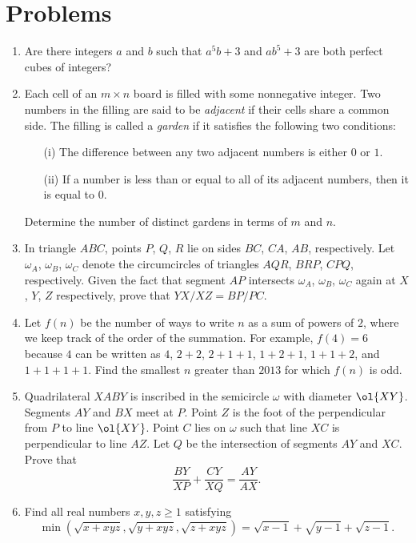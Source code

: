 \documentclass[11pt]{scrartcl}
\begin{document}
\section{Problems}
\begin{enumerate}[\bfseries 1.]
\item %
Are there integers $a$ and $b$
such that $a^5b+3$ and $ab^5+3$
are both perfect cubes of integers?

\item %
Each cell of an $m\times n$ board is filled with some nonnegative integer.
Two numbers in the filling are said to be
\emph{adjacent} if their cells share a common side.
The filling is called a \emph{garden} if it
satisfies the following two conditions:
\begin{enumerate}
  \item[(i)] The difference between
    any two adjacent numbers is either $0$ or $1$.
  \item[(ii)] If a number is less than or equal to
    all of its adjacent numbers, then it is equal to $0$.
\end{enumerate}
Determine the number of distinct gardens in terms of $m$ and $n$.

\item %
In triangle $ABC$,
points $P$, $Q$, $R$ lie on sides $BC$, $CA$, $AB$, respectively.
Let $\omega_A$, $\omega_B$, $\omega_C$ denote the
circumcircles of triangles $AQR$, $BRP$, $CPQ$, respectively.
Given the fact that segment $AP$ intersects
$\omega_A$, $\omega_B$, $\omega_C$ again at $X$, $Y$, $Z$ respectively,
prove that $YX/XZ=BP/PC$.

\item %
Let $f(n)$ be the number of ways to write $n$ as a sum of powers of $2$,
where we keep track of the order of the summation.
For example, $f(4)=6$ because $4$ can be written
as $4$, $2+2$, $2+1+1$, $1+2+1$, $1+1+2$, and $1+1+1+1$.
Find the smallest $n$ greater than $2013$ for which $f(n)$ is odd.

\item %
Quadrilateral $XABY$ is inscribed in the semicircle $\omega$ with
diameter $\ol{XY}$.
Segments $AY$ and $BX$ meet at $P$.
Point $Z$ is the foot of the perpendicular from $P$ to line $\ol{XY}$.
Point $C$ lies on $\omega$ such that line $XC$ is perpendicular to line $AZ$.
Let $Q$ be the intersection of segments $AY$ and $XC$.
Prove that
\[\dfrac{BY}{XP}+\dfrac{CY}{XQ}=\dfrac{AY}{AX}.\]

\item %
Find all real numbers $x,y,z \ge 1$ satisfying
\[ \min \left( \sqrt{x+xyz}, \sqrt{y+xyz}, \sqrt{z+xyz} \right)
  = \sqrt{x-1} + \sqrt{y-1} + \sqrt{z-1}. \]

\end{enumerate}
\pagebreak
\end{document}

